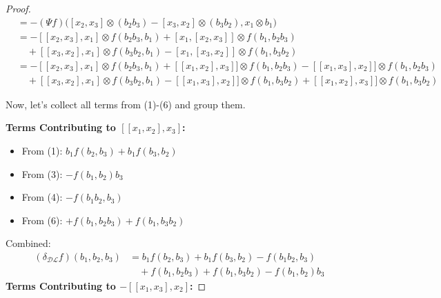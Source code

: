 \documentclass[10pt,a4paper]{amsart}
\newcommand{\DL}{\mathcal{DL}}
\begin{document}
\begin{proof}
\begin{align*}
&= -(\Psi f)\Big([x_2, x_3] \otimes (b_2 b_3) - [x_3, x_2] \otimes (b_3 b_2), x_1 \otimes b_1\Big) \\
&=  -[[x_2, x_3], x_1] \otimes f( b_2 b_3, b_1) + [x_1, [x_2, x_3]] \otimes f(b_1,b_2 b_3) \\
&\quad + [[x_3, x_2], x_1] \otimes f(b_3 b_2, b_1) -[x_1, [x_3, x_2]] \otimes f( b_1,b_3  b_2)\\
&=  -[[x_2, x_3], x_1] \otimes f( b_2 b_3, b_1) + [[x_1, x_2], x_3]] \otimes f(b_1,b_2 b_3)-[[x_1, x_3], x_2]] \otimes f(b_1,b_2 b_3) \\
&\quad + [[x_3, x_2], x_1] \otimes f(b_3 b_2, b_1) -[[x_1, x_3], x_2]] \otimes f( b_1,b_3  b_2)+[[x_1, x_2], x_3]] \otimes f( b_1,b_3  b_2)
\end{align*}


Now, let's collect all terms from (1)-(6) and group them.

\textbf{Terms Contributing to $[[x_1,x_2],x_3]$:}

\begin{itemize}
\item From (1): $b_1f(b_2,b_3)+b_1  f(b_3,b_2)$
\item From (3): $-f(b_1, b_2)b_3$
\item From (4): $-f(b_1b_2, b_3)$ 
\item From (6): $+f(b_1,b_2b_3)+f(b_1,b_3b_2)$
\end{itemize}

Combined:
\begin{align*}
(\delta_{\DL} f)(b_1, b_2, b_3) &= b_1 f(b_2,b_3)+b_1 f(b_3,b_2) - f(b_1  b_2, b_3) \\
&\quad + f(b_1, b_2  b_3) + f(b_1, b_3  b_2) - f(b_1,b_2)  b_3
\end{align*}
\textbf{Terms Contributing to $-[[x_1,x_3],x_2]$:}


\end{proof}
\end{document}
